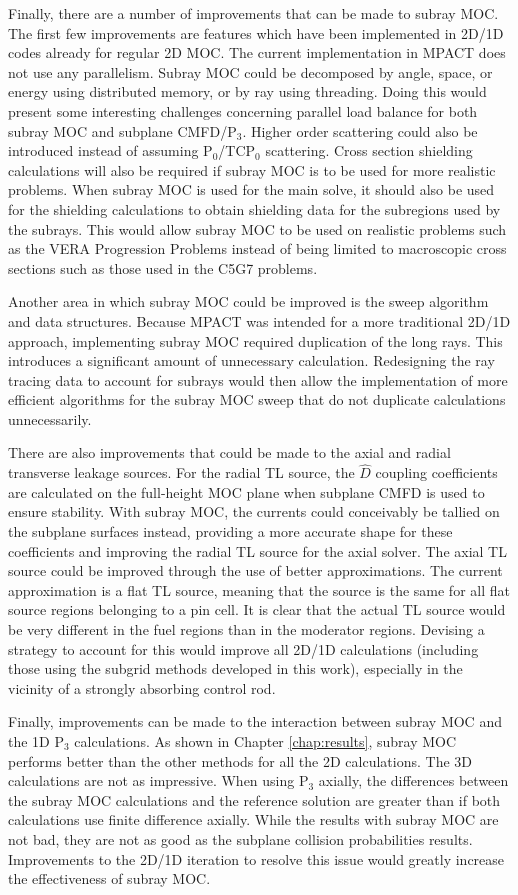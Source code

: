 Finally, there are a number of improvements that can be made to subray MOC.  The first few improvements are features which have been implemented in 2D/1D codes already for regular 2D MOC.  The current implementation in MPACT does not use any parallelism.  Subray MOC could be decomposed by angle, space, or energy using distributed memory, or by ray using threading.  Doing this would present some interesting challenges concerning parallel load balance for both subray MOC and subplane CMFD/P$_3$.  Higher order scattering could also be introduced instead of assuming P$_0$/TCP$_0$ scattering.  Cross section shielding calculations will also be required if subray MOC is to be used for more realistic problems.  When subray MOC is used for the main solve, it should also be used for the shielding calculations to obtain shielding data for the subregions used by the subrays.  This would allow subray MOC to be used on realistic problems such as the VERA Progression Problems instead of being limited to macroscopic cross sections such as those used in the C5G7 problems.

Another area in which subray MOC could be improved is the sweep algorithm and data structures.  Because MPACT was intended for a more traditional 2D/1D approach, implementing subray MOC required duplication of the long rays.  This introduces a significant amount of unnecessary calculation.  Redesigning the ray tracing data to account for subrays would then allow the implementation of more efficient algorithms for the subray MOC sweep that do not duplicate calculations unnecessarily.

There are also improvements that could be made to the axial and radial transverse leakage sources.  For the radial TL source, the $\hat{D}$ coupling coefficients are calculated on the full-height MOC plane when subplane CMFD is used to ensure stability.  With subray MOC, the currents could conceivably be tallied on the subplane surfaces instead, providing a more accurate shape for these coefficients and improving the radial TL source for the axial solver.  The axial TL source could be improved through the use of better approximations.  The current approximation is a flat TL source, meaning that the source is the same for all flat source regions belonging to a pin cell.  It is clear that the actual TL source would be very different in the fuel regions than in the moderator regions.  Devising a strategy to account for this would improve all 2D/1D calculations (including those using the subgrid methods developed in this work), especially in the vicinity of a strongly absorbing control rod.

Finally, improvements can be made to the interaction between subray MOC and the 1D P$_3$ calculations.  As shown in Chapter \ref{chap:results}, subray MOC performs better than the other methods for all the 2D calculations.  The 3D calculations are not as impressive.  When using P$_3$ axially, the differences between the subray MOC calculations and the reference solution are greater than if both calculations use finite difference axially.  While the results with subray MOC are not bad, they are not as good as the subplane collision probabilities results.  Improvements to the 2D/1D iteration to resolve this issue would greatly increase the effectiveness of subray MOC.